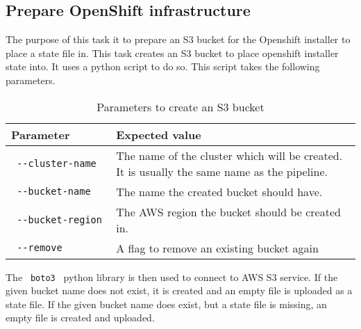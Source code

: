 \subsection{Prepare OpenShift infrastructure}\label{subsec:prepare-openshift-infrastructure}

The purpose of this task it to prepare an S3 bucket for the Openshift installer to place a state file in.
This task creates an S3 bucket to place openshift installer state into.
It uses a python script to do so.
This script takes the following parameters.

\begin{table}
    \centering
    \caption{Parameters to create an S3 bucket}
    \label{tab:parameters-to-create-an-s3-bucket}
    \begin{tabular}{| p{0.3\linewidth} | p{0.7\linewidth} |}
        Parameter & Expected value \\
        \hline
        \verb| --cluster-name | & The name of the cluster which will be created.
            It is usually the same name as the pipeline. \\
        \verb| --bucket-name | & The name the created bucket should have. \\
        \verb| --bucket-region | & The AWS region the bucket should be created in. \\
        \verb| --remove | & A flag to remove an existing bucket again \\
    \end{tabular}
\end{table}

The \verb| boto3 | python library is then used to connect to AWS S3 service.
If the given bucket name does not exist, it is created and an empty file is uploaded as a state file.
If the given bucket name does exist, but a state file is missing, an empty file is created and uploaded.
